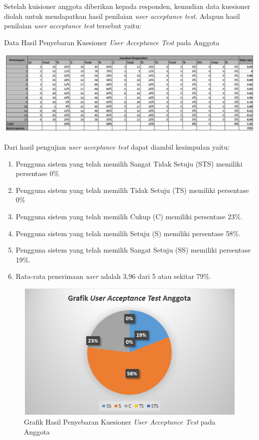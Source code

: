Setelah kuisioner anggota diberikan kepada responden, kemudian data kuesioner diolah untuk mendapatkan hasil penilaian \textit{user acceptance test}. Adapun hasil penilaian \textit{user acceptance test} tersebut yaitu:

\begin{table}[H]
	\centering
	\caption{Data Hasil Penyebaran Kuesioner \textit{User Acceptance Test} pada Anggota}
	\includegraphics[width=1\textwidth]{gambar/Hasil_Anggota}
\end{table}

Dari hasil pengujian \textit{user acceptance test} dapat diambil kesimpulan yaitu:

\begin{enumerate}
	\item Pengguna sistem yang telah memilih Sangat Tidak Setuju (STS) memiliki persentase 0\%
	\item Pengguna sistem yang telah memilih Tidak Setuju (TS) memiliki persentase 0\%
	\item Pengguna sistem yang telah memilih Cukup (C) memiliki persentase 23\%.
	\item Pengguna sistem yang telah memilih Setuju (S) memiliki persentase 58\%.
	\item Pengguna sistem yang telah memilih Sangat Setuju (SS) memiliki persentase 19\%.
	\item Rata-rata penerimaan \textit{user} adalah 3,96 dari 5 atau sekitar 79\%.
\end{enumerate}

\begin{figure}[H]
	\centering
	\includegraphics[width=1\textwidth]{gambar/Grafik_Anggota}
	\caption{Grafik Hasil Penyebaran Kuesioner \textit{User Acceptance Test} pada Anggota}
\end{figure}

